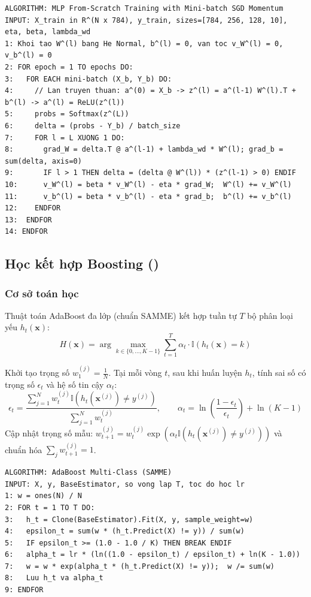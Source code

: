 \begin{lstlisting}[style=pseudocode, caption={Thuật toán huấn luyện MLP From-Scratch với SGD Momentum}]
ALGORITHM: MLP From-Scratch Training with Mini-batch SGD Momentum
INPUT: X_train in R^(N x 784), y_train, sizes=[784, 256, 128, 10], eta, beta, lambda_wd
1: Khoi tao W^(l) bang He Normal, b^(l) = 0, van toc v_W^(l) = 0, v_b^(l) = 0
2: FOR epoch = 1 TO epochs DO:
3:   FOR EACH mini-batch (X_b, Y_b) DO:
4:     // Lan truyen thuan: a^(0) = X_b -> z^(l) = a^(l-1) W^(l).T + b^(l) -> a^(l) = ReLU(z^(l))
5:     probs = Softmax(z^(L))
6:     delta = (probs - Y_b) / batch_size
7:     FOR l = L XUONG 1 DO:
8:       grad_W = delta.T @ a^(l-1) + lambda_wd * W^(l); grad_b = sum(delta, axis=0)
9:       IF l > 1 THEN delta = (delta @ W^(l)) * (z^(l-1) > 0) ENDIF
10:      v_W^(l) = beta * v_W^(l) - eta * grad_W;  W^(l) += v_W^(l)
11:      v_b^(l) = beta * v_b^(l) - eta * grad_b;  b^(l) += v_b^(l)
12:    ENDFOR
13:  ENDFOR
14: ENDFOR
\end{lstlisting}

\subsection{Học kết hợp Boosting ()}
\subsubsection{Cơ sở toán học}
Thuật toán AdaBoost đa lớp (chuẩn SAMME) kết hợp tuần tự $T$ bộ phân loại yếu $h_t(\mathbf{x})$:
\begin{equation}
    H(\mathbf{x}) = \arg\max_{k \in \{0, \dots, K-1\}} \sum_{t=1}^T \alpha_t \cdot \mathbb{I}(h_t(\mathbf{x}) = k)
\end{equation}

Khởi tạo trọng số $w_1^{(j)} = \frac{1}{N}$. Tại mỗi vòng $t$, sau khi huấn luyện $h_t$, tính sai số có trọng số $\epsilon_t$ và hệ số tin cậy $\alpha_t$:
\begin{equation}
    \epsilon_t = \frac{\sum_{j=1}^N w_t^{(j)} \mathbb{I}(h_t(\mathbf{x}^{(j)}) \neq y^{(j)})}{\sum_{j=1}^N w_t^{(j)}}, \qquad \alpha_t = \ln\left(\frac{1 - \epsilon_t}{\epsilon_t}\right) + \ln(K - 1)
\end{equation}
Cập nhật trọng số mẫu: $w_{t+1}^{(j)} = w_t^{(j)} \exp(\alpha_t \mathbb{I}(h_t(\mathbf{x}^{(j)}) \neq y^{(j)}))$ và chuẩn hóa $\sum_j w_{t+1}^{(j)} = 1$.

\begin{lstlisting}[style=pseudocode, caption={Thuật toán AdaBoost đa lớp (SAMME)}]
ALGORITHM: AdaBoost Multi-Class (SAMME)
INPUT: X, y, BaseEstimator, so vong lap T, toc do hoc lr
1: w = ones(N) / N
2: FOR t = 1 TO T DO:
3:   h_t = Clone(BaseEstimator).Fit(X, y, sample_weight=w)
4:   epsilon_t = sum(w * (h_t.Predict(X) != y)) / sum(w)
5:   IF epsilon_t >= (1.0 - 1.0 / K) THEN BREAK ENDIF
6:   alpha_t = lr * (ln((1.0 - epsilon_t) / epsilon_t) + ln(K - 1.0))
7:   w = w * exp(alpha_t * (h_t.Predict(X) != y));  w /= sum(w)
8:   Luu h_t va alpha_t
9: ENDFOR
\end{lstlisting}
